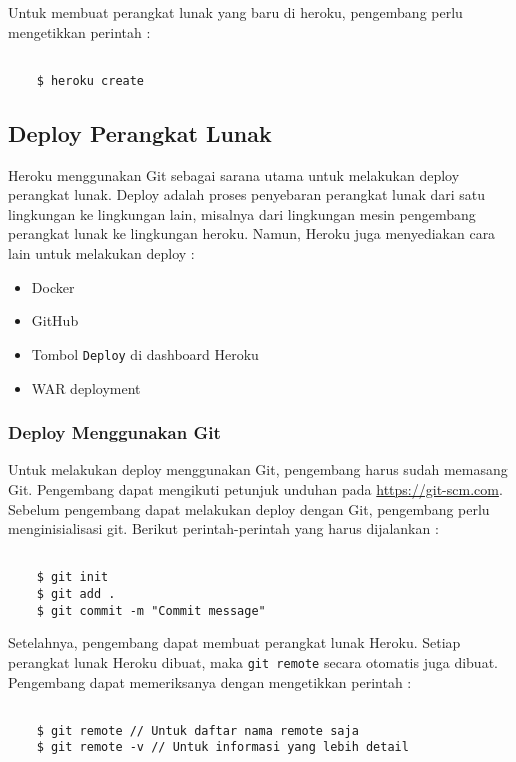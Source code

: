 Untuk membuat perangkat lunak yang baru di heroku, pengembang perlu mengetikkan perintah :
\begin{lstlisting}

	$ heroku create

\end{lstlisting}

\subsection{Deploy Perangkat Lunak}
Heroku menggunakan Git sebagai sarana  utama untuk melakukan deploy perangkat lunak. Deploy adalah proses penyebaran perangkat lunak dari satu lingkungan ke lingkungan lain, misalnya dari lingkungan mesin pengembang perangkat lunak ke lingkungan heroku. Namun, Heroku juga menyediakan cara lain untuk melakukan deploy :
\begin{itemize}
\item Docker
\item GitHub
\item Tombol \texttt{Deploy} di dashboard Heroku
\item WAR deployment
\end{itemize}

\subsubsection{Deploy Menggunakan Git}
Untuk melakukan deploy menggunakan Git, pengembang harus sudah memasang Git. Pengembang dapat mengikuti petunjuk unduhan pada \url{https://git-scm.com}. Sebelum pengembang dapat melakukan deploy dengan Git, pengembang perlu menginisialisasi git. Berikut perintah-perintah yang harus dijalankan :
\begin{lstlisting}

	$ git init
	$ git add .
	$ git commit -m "Commit message"

\end{lstlisting}

Setelahnya, pengembang dapat membuat perangkat lunak Heroku. Setiap perangkat lunak Heroku dibuat, maka \texttt{git remote} secara otomatis juga dibuat. Pengembang dapat memeriksanya dengan mengetikkan perintah :
\begin{lstlisting}

	$ git remote // Untuk daftar nama remote saja
	$ git remote -v // Untuk informasi yang lebih detail

\end{lstlisting}

